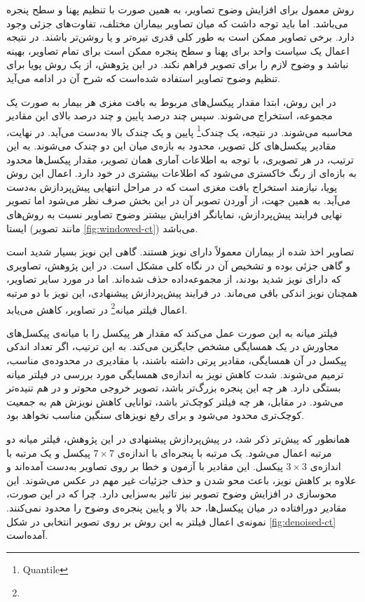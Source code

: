 روش معمول برای افزایش وضوح تصاویر، به همین صورت با تنظیم پهنا و سطح پنجره می‌باشد.
اما باید توجه داشت که میان تصاویر بیماران مختلف، تفاوت‌های جزئی وجود دارد.
برخی تصاویر ممکن است به طور کلی قدری تیره‌تر و یا روشن‌تر باشند.
در نتیجه اعمال یک سیاست واحد برای پهنا و سطح پنجره ممکن است برای تمام تصاویر، بهینه نباشد و وضوح لازم را برای تصویر فراهم نکند.
در این پژوهش، از یک روش پویا برای تنظیم وضوح تصاویر استفاده شده‌است که شرح آن در ادامه می‌آید.

در این روش، ابتدا مقدار پیکسل‌های مربوط به بافت مغزی هر بیمار به صورت یک مجموعه، استخراج می‌شوند.
سپس چند درصد پایین و چند درصد بالای این مقادیر محاسبه می‌شوند.
در نتیجه، یک 
چندک\footnote{Quantile} 
پایین و یک چندک بالا به‌دست می‌آید.
در نهایت، مقادیر پیکسل‌های کل تصویر، محدود به بازه‌ی میان این دو چندک می‌شوند.
به این ترتیب، در هر تصویری، با توجه به اطلاعات آماری همان تصویر، 
مقدار پیکسل‌ها محدود به بازه‌ای از رنگ خاکستری می‌شود که اطلاعات بیشتری در خود دارد.
اعمال این روش پویا، نیازمند استخراج بافت مغزی است که در مراحل انتهایی پیش‌پردازش به‌دست می‌آید.
به همین جهت، از آوردن تصویر آن در این بخش صرف نظر می‌شود
اما تصویر نهایی فرایند پیش‌پردازش، نمایانگر افزایش بیشتر وضوح 
تصاویر نسبت به روش‌های ایستا (مانند تصویر \ref{fig:windowed-ct}) می‌باشد.


تصاویر اخذ شده از بیماران معمولاً دارای نویز هستند.
گاهی این نویز بسیار شدید است و گاهی جزئی بوده و تشخیص آن در نگاه کلی مشکل است.
در این پژوهش، تصاویری که دارای نویز شدید بودند، از مجموعه‌داده حذف شده‌اند.
اما در مورد سایر تصاویر، همچنان نویز اندکی باقی می‌ماند.
در فرایند پیش‌پردازش پیشنهادی، این نویز با دو مرتبه اعمال 
فیلتر میانه\footnote{}
در تصاویر، کاهش می‌یابد.

فیلتر میانه به این صورت عمل می‌کند که مقدار هر پیکسل را 
با میانه‌ی پیکسل‌های مجاورش در یک همسایگی مشخص جایگزین می‌کند.
به این ترتیب، اگر تعداد اندکی پیکسل در آن همسایگی، مقادیر پرتی داشته باشند، با مقادیری در محدوده‌ی مناسب، ترمیم می‌شوند.
شدت کاهش نویز به اندازه‌ی همسایگی مورد بررسی در فیلتر میانه بستگی دارد.
هر چه این پنجره بزرگ‌تر باشد، تصویر خروجی محو‌تر و در هم تنیده‌تر
می‌شود.
در مقابل، هر چه فیلتر کوچک‌تر باشد، توانایی کاهش نویزش هم به جمعیت کوچک‌تری محدود می‌شود و برای رفع نویز‌های سنگین مناسب نخواهد بود.

همانطور که پیش‌تر ذکر شد، در پیش‌پردازش پیشنهادی در این پژوهش، فیلتر میانه دو مرتبه اعمال می‌شود. 
یک مرتبه با پنجره‌ای با اندازه‌ی $7 \times 7$ پیکسل و یک مرتبه با اندازه‌ی $3 \times 3$ پیکسل.
این مقادیر با آزمون و خطا بر روی تصاویر به‌دست آمده‌اند و علاوه بر کاهش نویز، باعث محو شدن و حذف جزئیات غیر مهم در عکس می‌شوند.
این محو‌سازی در افزایش وضوح تصویر نیز تاثیر به‌سزایی دارد.
چرا که در این صورت، مقادیر دورافتاده در میان پیکسل‌ها، حد بالا و پایین پنجره‌ی وضوح را محدود نمی‌کنند.
نمونه‌ی اعمال فیلتر به این روش بر روی تصویر انتخابی 
در شکل
\ref{fig:denoised-ct}
آمده‌است.

